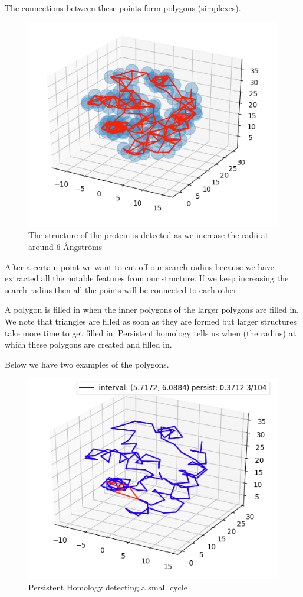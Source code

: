 \documentclass[12pt, a4paper, twocolumn, fullpage]{article}
\theoremstyle{plain}
\theoremstyle{definition}
\theoremstyle{remark}
\begin{document}
The connections between these points form polygons (simplexes).
\begin{figure}
    \includegraphics[width=\linewidth]{img/hom/ballRad3.png}
    \caption{The structure of the protein is detected as we increase the radii at around 6 Ångströms}
    \label{ballRad3}
\end{figure}
After a certain point we want to cut off our search radius because we have extracted all the notable features from our structure. If we keep increasing the search radius then all the points will be connected to each other.

A polygon is filled in when the inner polygons of the larger polygons are filled in. We note that triangles are filled as soon as they are formed but larger structures take more time to get filled in.
Persistent homology tells us when (the radius) at which these polygons are created and filled in.

Below we have two examples of the polygons.
\begin{figure}
    \includegraphics[width=\linewidth]{img/hom/Simplex1.png}
    \caption{Persistent Homology detecting a small cycle }
    \label{Simplex1}
\end{figure}
\end{document}
